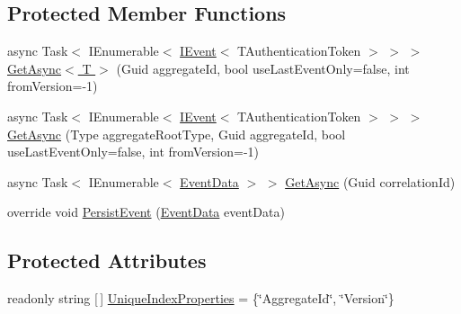\subsection*{Protected Member Functions}
\begin{DoxyCompactItemize}
\item 
async Task$<$ I\+Enumerable$<$ \hyperlink{interfaceCqrs_1_1Events_1_1IEvent}{I\+Event}$<$ T\+Authentication\+Token $>$ $>$ $>$ \hyperlink{classCqrs_1_1Azure_1_1DocumentDb_1_1Events_1_1AzureDocumentDbEventStore_a2845015d6fda0d9e79b77b82d9452a4d_a2845015d6fda0d9e79b77b82d9452a4d}{Get\+Async$<$ T $>$} (Guid aggregate\+Id, bool use\+Last\+Event\+Only=false, int from\+Version=-\/1)
\item 
async Task$<$ I\+Enumerable$<$ \hyperlink{interfaceCqrs_1_1Events_1_1IEvent}{I\+Event}$<$ T\+Authentication\+Token $>$ $>$ $>$ \hyperlink{classCqrs_1_1Azure_1_1DocumentDb_1_1Events_1_1AzureDocumentDbEventStore_a8b481bf0b0f6b50184441965630f5443_a8b481bf0b0f6b50184441965630f5443}{Get\+Async} (Type aggregate\+Root\+Type, Guid aggregate\+Id, bool use\+Last\+Event\+Only=false, int from\+Version=-\/1)
\item 
async Task$<$ I\+Enumerable$<$ \hyperlink{classCqrs_1_1Events_1_1EventData}{Event\+Data} $>$ $>$ \hyperlink{classCqrs_1_1Azure_1_1DocumentDb_1_1Events_1_1AzureDocumentDbEventStore_ae44ea4b68f4794022b685bc380abbd04_ae44ea4b68f4794022b685bc380abbd04}{Get\+Async} (Guid correlation\+Id)
\item 
override void \hyperlink{classCqrs_1_1Azure_1_1DocumentDb_1_1Events_1_1AzureDocumentDbEventStore_afe494469614082cf667f5cf4b6c4a97b_afe494469614082cf667f5cf4b6c4a97b}{Persist\+Event} (\hyperlink{classCqrs_1_1Events_1_1EventData}{Event\+Data} event\+Data)
\end{DoxyCompactItemize}
\subsection*{Protected Attributes}
\begin{DoxyCompactItemize}
\item 
readonly string \mbox{[}$\,$\mbox{]} \hyperlink{classCqrs_1_1Azure_1_1DocumentDb_1_1Events_1_1AzureDocumentDbEventStore_ab2a2b5dd046487edc33917983587d847_ab2a2b5dd046487edc33917983587d847}{Unique\+Index\+Properties} = \{\char`\"{}Aggregate\+Id\char`\"{}, \char`\"{}Version\char`\"{}\}
\end{DoxyCompactItemize}
